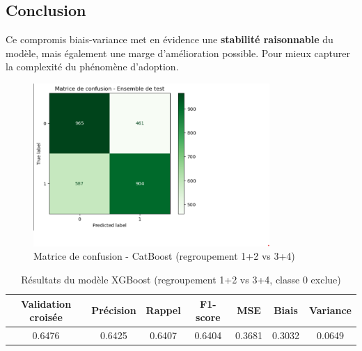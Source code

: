 \documentclass[a4paper,12pt]{article}
\begin{document}
\subsection*{Conclusion}
 
Ce compromis biais-variance met en évidence une \textbf{stabilité raisonnable} du modèle, mais également une marge d’amélioration possible. Pour mieux capturer la complexité du phénomène d’adoption.
 
 
\begin{figure}[H]

    \centering

    \includegraphics[width=0.8\textwidth]{xgboost1.png}

    \caption{Matrice de confusion - CatBoost (regroupement 1+2 vs 3+4)}

    \label{fig:catboost012_conf}

\end{figure}
 
 
\begin{table}[h]

\centering

\begin{tabular}{|c|c|c|c|c|c|c|}

\hline

\textbf{Validation croisée} & \textbf{Précision} & \textbf{Rappel} & \textbf{F1-score} & \textbf{MSE} & \textbf{Biais} & \textbf{Variance} \\

\hline

0.6476 & 0.6425 & 0.6407 & 0.6404 & 0.3681 & 0.3032 & 0.0649 \\

\hline

\end{tabular}

\caption{Résultats du modèle XGBoost (regroupement 1+2 vs 3+4, classe 0 exclue)}

\end{table}
\end{document}
